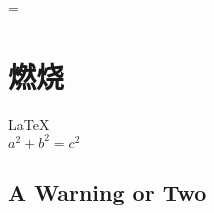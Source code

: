 \documentclass[UTF8]{ctexart}
\begin{document}
 =       
 
\section{燃烧}          
\LaTeX \,\\ 
 $a^2+b^2=c^2$

\subsection{A Warning or Two}  

\end{document}
